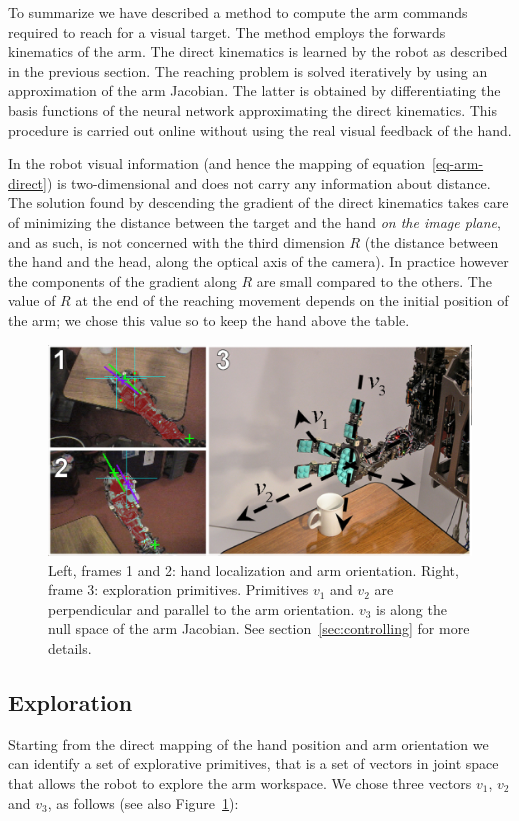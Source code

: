 To summarize we have described a method to compute the arm
commands required to reach for a visual target. The method employs
the forwards kinematics of the arm. The direct kinematics is
learned by the robot as described in the previous section. The
reaching problem is solved iteratively by using an approximation
of the arm Jacobian. The latter is obtained by differentiating the
basis functions of the neural network approximating the direct
kinematics. This procedure is carried out online without using the
real visual feedback of the hand.

In the robot visual information (and hence the mapping of equation~\ref{eq-arm-direct})
is two-dimensional and does not carry any information
about distance. The solution found by descending the gradient of the
direct kinematics takes care of minimizing the distance between the target
and the hand \emph{on the image plane}, and as such, is not concerned
with the third dimension $R$ (the distance between the hand and the head, 
along the optical axis of the camera).
In practice however the components of the gradient along $R$ are small
compared to the others. The value of $R$ at the end of the reaching movement
depends on the initial position of the arm; we chose this value so to keep
the hand above the table.
%
\begin{figure}[tb]
  \centerline{
    \includegraphics[width=\columnwidth, angle=0 ]{./figures/expl-directions.eps}
  }\caption{Left, frames 1 and 2: hand localization and arm
    orientation. Right, frame 3: exploration primitives. Primitives $v_1$
and $v_2$ are perpendicular and parallel to the arm orientation.
$v_3$ is along the null space of the arm Jacobian. See
section~\ref{sec:controlling} for
 more details.}
\label{fig:expl-directions}
\end{figure}
%
\subsection{Exploration}
Starting from the direct mapping of the hand position and arm orientation we
can identify a set of explorative primitives, that is a set of vectors in
joint space that allows the robot to explore the arm workspace. We chose three
vectors $v_1$, $v_2$ and $v_3$, as follows (see also 
Figure~\ref{fig:expl-directions}):

